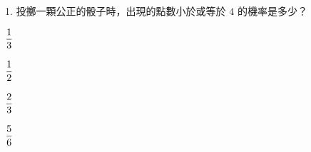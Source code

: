 \documentclass[12pt]{article}
\begin{document}
\begin{problem}
  \item[1.] 投擲一顆公正的骰子時，出現的點數小於或等於 $4$ 的機率是多少？
  \begin{choices}
    \item $\fraction{1}{3}$
    \item $\fraction{1}{2}$
    \item $\fraction{2}{3}$
    \item $\fraction{5}{6}$
  \end{choices}
\end{problem}
\end{document}
